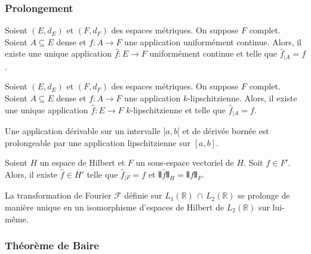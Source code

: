 	\subsubsection{Prolongement}
	
	
	\begin{theorem}
		Soient $(E,d_E)$ et $(F,d_F)$ des espaces métriques. On suppose $F$ complet. Soient $A \subseteq E$ dense et $f : A \rightarrow F$ une application uniformément continue. Alors, il existe une unique application $\widehat{f} : E \rightarrow F$ uniformément continue et telle que $\widehat{f}_{|A} = f$.
	\end{theorem}
	
	\begin{corollary}
		Soient $(E,d_E)$ et $(F,d_F)$ des espaces métriques. On suppose $F$ complet. Soient $A \subseteq E$ dense et $f : A \rightarrow F$ une application $k$-lipschitzienne. Alors, il existe une unique application $\widehat{f} : E \rightarrow F$ $k$-lipschitzienne et telle que $\widehat{f}_{|A} = f$.
	\end{corollary}
	
	\begin{example}
		Une application dérivable sur un intervalle $]a,b[$ et de dérivée bornée est prolongeable par une application lipschitzienne sur $[a,b]$.
	\end{example}
	
	
	\begin{application}
		Soient $H$ un espace de Hilbert et $F$ un sous-espace vectoriel de $H$. Soit $f \in F'$. Alors, il existe $\widehat{f} \in H'$ telle que $\widehat{f}_{|F} = f$ et $\VERT \widehat{f} \VERT_{H} = \VERT f \VERT_{F}$.
	\end{application}
	
	
	\begin{application}
		La transformation de Fourier $\mathcal{F}$ définie sur $L_1(\mathbb{R}) \, \cap \, L_2(\mathbb{R})$ se prolonge de manière unique en un isomorphisme d'espaces de Hilbert de $L_2(\mathbb{R})$ sur lui-même.
	\end{application}
	
	\subsubsection{Théorème de Baire}
	
